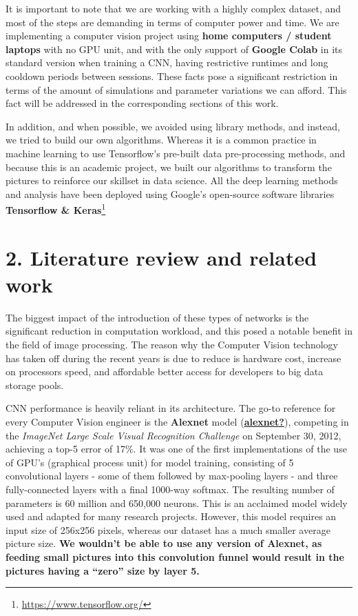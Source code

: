 \documentclass[
  11pt,
]{article}
\begin{document}
It is important to note that we are working with a highly complex
dataset, and most of the steps are demanding in terms of computer power
and time. We are implementing a computer vision project using
\textbf{home computers / student laptops} with no GPU unit, and with the
only support of \textbf{Google Colab} in its standard version when
training a CNN, having restrictive runtimes and long cooldown periods
between sessions. These facts pose a significant restriction in terms of
the amount of simulations and parameter variations we can afford. This
fact will be addressed in the corresponding sections of this work.

In addition, and when possible, we avoided using library methods, and
instead, we tried to build our own algorithms. Whereas it is a common
practice in machine learning to use Tensorflow's pre-built data
pre-processing methods, and because this is an academic project, we
built our algorithms to transform the pictures to reinforce our skillset
in data science. All the deep learning methods and analysis have been
deployed using Google's open-source software libraries
\textbf{Tensorflow \& Keras}\footnote{\url{https://www.tensorflow.org/}}

\hypertarget{sec:literature}{%
\section{2. Literature review and related work}\label{sec:literature}}

The biggest impact of the introduction of these types of networks is the
significant reduction in computation workload, and this posed a notable
benefit in the field of image processing. The reason why the Computer
Vision technology has taken off during the recent years is due to reduce
is hardware cost, increase on processors speed, and affordable better
access for developers to big data storage pools.

CNN performance is heavily reliant in its architecture. The go-to
reference for every Computer Vision engineer is the \textbf{Alexnet}
model (\protect\hyperlink{ref-alexnet}{\textbf{alexnet?}}), competing in
the \emph{ImageNet Large Scale Visual Recognition Challenge} on
September 30, 2012, achieving a top-5 error of 17\%. It was one of the
first implementations of the use of GPU's (graphical process unit) for
model training, consisting of 5 convolutional layers - some of them
followed by max-pooling layers - and three fully-connected layers with a
final 1000-way softmax. The resulting number of parameters is 60 million
and 650,000 neurons. This is an acclaimed model widely used and adapted
for many research projects. However, this model requires an input size
of 256x256 pixels, whereas our dataset has a much smaller average
picture size. \textbf{We wouldn't be able to use any version of Alexnet,
as feeding small pictures into this convolution funnel would result in
the pictures having a ``zero'' size by layer 5.}
\end{document}
